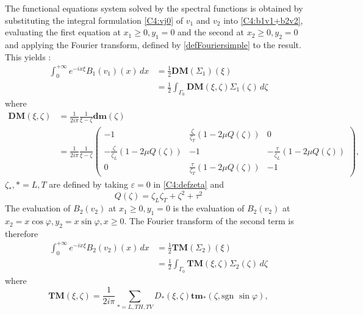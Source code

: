 The functional equations system solved by the spectral functions is obtained by substituting the integral formulation \eqref{C4:vj0} of $v_1$ and $v_2$ into \eqref{C4:b1v1+b2v2}, evaluating the first equation at $x_1\geq 0, y_1=0$ and the second at $x_2\geq 0, y_2=0$ and applying the Fourier transform, defined by \eqref{defFouriersimple} to the result. This yields :
\begin{equation}
\begin{split}
\int_0^{+\infty} e^{-ix\xi}B_1(v_1)(x)\,dx&=\frac{1}{2}\textbf{DM}(\Sigma_1)(\xi) \\
&=\frac{1}{2} \int_{\Gamma_0}\textbf{DM}(\xi,\zeta)\Sigma_1(\zeta)\,d\zeta
\end{split}
\label{C4:B1DM}
\end{equation}
where
\begin{equation}
\begin{split}
\textbf{DM}(\xi,\zeta)&=\frac{1}{2i\pi} \frac{1}{\xi-\zeta} \textbf{dm}(\zeta) \\
&=\frac{1}{2i\pi} \frac{1}{\xi-\zeta} \begin{pmatrix}
-1 & \frac{\zeta}{\zeta_T}(1-2\mu Q(\zeta)) & 0\\
-\frac{\zeta}{\zeta_L}(1-2\mu Q(\zeta))  & -1&-\frac{\tau}{\zeta_L}(1-2\mu Q(\zeta)) \\
0&\frac{\tau}{\zeta_T}(1-2\mu Q(\zeta)) &-1
\end{pmatrix},
 \end{split}
\label{C4:defDM}
\end{equation}
$\zeta_*, *=L,T$ are defined by taking $\varepsilon=0$ in \eqref{C4:defzeta} and
\begin{equation}
Q(\zeta) =\zeta_L\zeta_T+\zeta^2+\tau^2
\end{equation}
The evaluation of $B_2(v_2)$ at $x_1\geq 0, y_1=0$ is the evaluation of  $B_2(v_2)$ at $x_2=x\cos\varphi, y_2=x\sin\varphi, x\geq 0$. The Fourier transform of the second term is therefore
\begin{equation}
\begin{split}
\int_0^{+\infty} e^{-ix\xi}B_2(v_2)(x)\,dx&=\frac{1}{2}\textbf{TM}(\Sigma_2)(\xi) \\
&=\frac{1}{2} \int_{\Gamma_0}\textbf{TM}(\xi,\zeta)\Sigma_2(\zeta)\,d\zeta
\end{split}
\label{C4:B2TM}
\end{equation}
where
\begin{equation}
\textbf{TM}(\xi,\zeta)=\frac{1}{2i\pi}\sum_{*=L,TH,TV}D_*(\xi,\zeta)\textbf{tm}_*(\zeta,\mbox{sgn } \sin \varphi),
\label{C4:defTM}
\end{equation}
